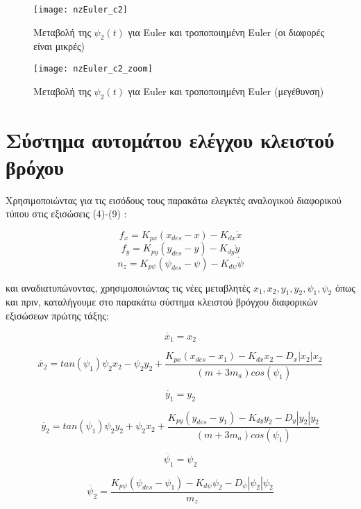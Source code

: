 \documentclass{article}
\begin{document}
\clearpage
\begin{figure}[h!]
\texttt{[image: nzEuler\_c2]}
\caption{Μεταβολή της $\psi_2(t)$ για Euler και τροποποιημένη Euler (οι διαφορές είναι μικρές)}
\end{figure}

\begin{figure}[h!]
\texttt{[image: nzEuler\_c2\_zoom]}
\caption{Μεταβολή της $\psi_2(t)$ για Euler και τροποποιημένη Euler (μεγέθυνση)}
\label{l_12}
\end{figure}
\clearpage

\section{Σύστημα αυτομάτου ελέγχου κλειστού βρόχου}

Χρησιμοποιώντας για τις εισόδους τους παρακάτω ελεγκτές αναλογικού διαφορικού τύπου στις εξισώσεις (4)-(9) :

\[f_x = K_{px}(x_{des} - x) - K_{dx}\dot{x} \]
\[f_y = K_{py}(y_{des} - y) - K_{dy}\dot{y} \]
\[n_z = K_{p\psi}(\psi_{des} - \psi) - K_{d\psi}\dot{\psi} \]

και αναδιατυπώνοντας, χρησιμοποιώντας τις νέες μεταβλητές \(x_1, x_2, y_1, y_2, \psi_1, \psi_2\) όπως και πριν, καταλήγουμε στο παρακάτω σύστημα κλειστού βρόγχου διαφορικών εξισώσεων πρώτης τάξης:



\begin{equation}
\dot{x_1} = x_2
\end{equation}

\begin{equation}
\dot{x_2} = tan(\psi_1)\psi_2x_2 - \psi_2y_2 + \frac{K_{px}(x_{des} - x_1) - K_{dx}x_2 - D_x|x_2|x_2}{(m + 3m_a)cos(\psi_1)} 
\end{equation}

\begin{equation}
\dot{y_1} = y_2
\end{equation}

\begin{equation}
\dot{y_2} = tan(\psi_1)\psi_2y_2 + \psi_2x_2 + \frac{K_{py}(y_{des} - y_1) - K_{dy}y_2 - D_y|y_2|y_2}{(m + 3m_a)cos(\psi_1)} 
\end{equation}

\begin{equation}
\dot{\psi_1} = \psi_2
\end{equation}

\begin{equation}
\dot{\psi_2} = \frac{K_{p\psi}(\psi_{des} - \psi_1) - K_{d\psi}\psi_2  - D_\psi|\psi_2|\psi_2}{m_z} 
\end{equation}
\end{document}
